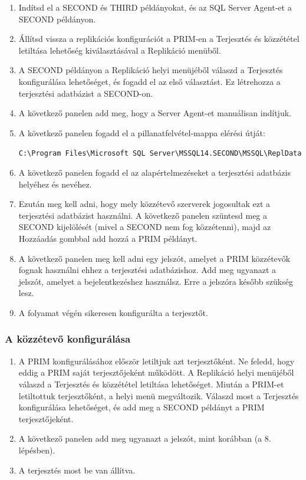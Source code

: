 \documentclass[
  magyar,
]{article}
\begin{document}
\begin{enumerate}
\def\labelenumi{\arabic{enumi}.}
\item
  Indítsd el a SECOND és THIRD példányokat, és az SQL Server Agent-et a
  SECOND példányon.
\item
  Állítsd vissza a replikációs konfigurációt a PRIM-en a Terjesztés és
  közzététel letiltása lehetőség kiválasztásával a Replikáció menüből.
\item
  A SECOND példányon a Replikáció helyi menüjéből válaszd a Terjesztés
  konfigurálása lehetőséget, és fogadd el az első választást. Ez
  létrehozza a terjesztési adatbázist a SECOND-on.
\item
  A következő panelen add meg, hogy a Server Agent-et manuálisan
  indítjuk.
\item
  A következő panelen fogadd el a pillanatfelvétel-mappa elérési útját:

  \texttt{C:\textbackslash{}Program\ Files\textbackslash{}Microsoft\ SQL\ Server\textbackslash{}MSSQL14.SECOND\textbackslash{}MSSQL\textbackslash{}ReplData}
\item
  A következő panelen fogadd el az alapértelmezéseket a terjesztési
  adatbázis helyéhez és nevéhez.
\item
  Ezután meg kell adni, hogy mely közzétevő szerverek jogosultak ezt a
  terjesztési adatbázist használni. A következő panelen szüntesd meg a
  SECOND kijelölését (mivel a SECOND nem fog közzétenni), majd az
  Hozzáadás gombbal add hozzá a PRIM példányt.
\item
  A következő panelen meg kell adni egy jelszót, amelyet a PRIM
  közzétevők fognak használni ehhez a terjesztési adatbázishoz. Add meg
  ugyanazt a jelszót, amelyet a bejelentkezéshez használsz. Erre a
  jelszóra később szükség lesz.
\item
  A folyamat végén sikeresen konfigurálta a terjesztőt.
\end{enumerate}

\subsubsection{A közzétevő
konfigurálása}\label{a-kuxf6zzuxe9tevux151-konfiguruxe1luxe1sa}

\begin{enumerate}
\def\labelenumi{\arabic{enumi}.}
\item
  A PRIM konfigurálásához először letiltjuk azt terjesztőként. Ne
  feledd, hogy eddig a PRIM saját terjesztőjeként működött. A Replikáció
  helyi menüjéből válaszd a Terjesztés és közzététel letiltása
  lehetőséget. Miután a PRIM-et letiltottuk terjesztőként, a helyi menü
  megváltozik. Válaszd most a Terjesztés konfigurálása lehetőséget, és
  add meg a SECOND példányt a PRIM terjesztőjeként.
\item
  A következő panelen add meg ugyanazt a jelszót, mint korábban (a 8.
  lépésben).
\item
  A terjesztés most be van állítva.
\end{enumerate}
\end{document}
